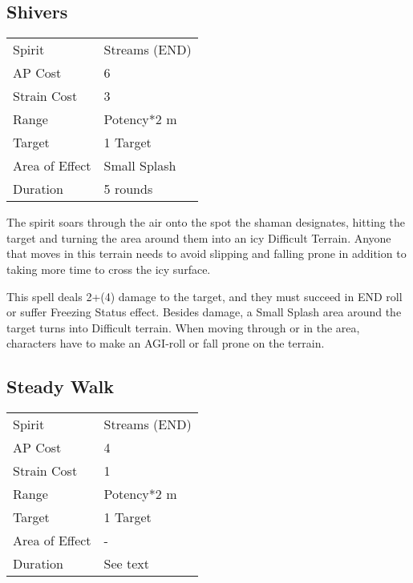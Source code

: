 \documentclass[11pt,a4paper,twocolumn]{book}
\begin{document}
\subsection*{Shivers}
{
	\begin{tabu} to 75mm{| X[l,4] | X[l,7] |}
		\hline
		Spirit 			& Streams (END) 		\\
		AP Cost	      	& 6 						\\
		Strain Cost     & 3 						\\
		Range     		& Potency*2	m				\\
		Target      	& 1 Target					\\
		Area of Effect  & Small Splash  	 				\\
		Duration     	& 5 rounds			\\ \hline
	\end{tabu}
	
}

The spirit soars through the air onto the spot the shaman designates, hitting the target and turning the area around them into an icy Difficult Terrain. Anyone that moves in this terrain needs to avoid slipping and falling prone in addition to taking more time to cross the icy surface.

This spell deals 2+(4) damage to the target, and they must succeed in END roll or suffer Freezing Status effect. Besides damage, a Small Splash area around the target turns into Difficult terrain. When moving through or in the area, characters have to make an AGI-roll or fall prone on the terrain.


\subsection*{Steady Walk}
{
	\begin{tabu} to 75mm{| X[l,4] | X[l,7] |}
		\hline
		Spirit 			& Streams (END) 	\\
		AP Cost	      	& 4 					\\
		Strain Cost     & 1 					\\
		Range     		& Potency*2 m			\\
		Target      	& 1 Target				\\
		Area of Effect  & - 	 				\\
		Duration     	& See text	            \\ \hline
	\end{tabu}
	
}
\end{document}
